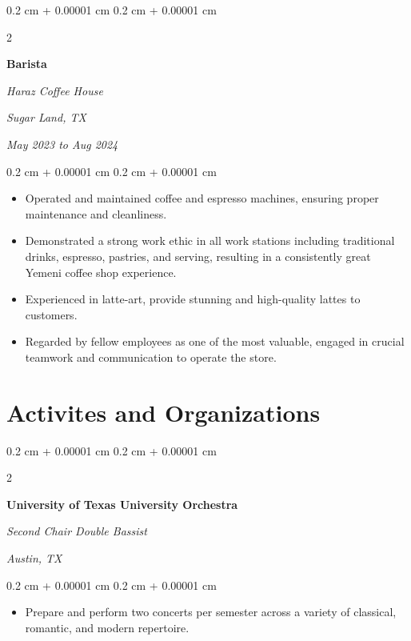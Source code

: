 \documentclass[10pt, letterpaper]{article}
\newenvironment{highlights}{
    \begin{itemize}[
        topsep=0.10 cm,
        parsep=0.10 cm,
        partopsep=0pt,
        itemsep=0pt,
        leftmargin=0.4 cm + 10pt
    ]
}{
    \end{itemize}
} %
\newenvironment{onecolentry}{
    \begin{adjustwidth}{
        0.2 cm + 0.00001 cm
    }{
        0.2 cm + 0.00001 cm
    }
}{
    \end{adjustwidth}
} %
\newenvironment{twocolentry}[2][]{
    \onecolentry
    \def\secondColumn{#2}
    \setcolumnwidth{\fill, 4.5 cm}
    \begin{paracol}{2}
}{
    \switchcolumn \raggedleft \secondColumn
    \end{paracol}
    \endonecolentry
} %
\begin{document}
        \vspace{0.2 cm}

        \begin{twocolentry}{
        \textit{Sugar Land, TX}    
            
        \textit{May 2023 to Aug 2024}}
            \textbf{Barista}
            
            \textit{Haraz Coffee House}
        \end{twocolentry}

        \vspace{0.10 cm}
        \begin{onecolentry}
            \begin{highlights}
                \item Operated and maintained coffee and espresso machines, ensuring proper maintenance and cleanliness.
                \item Demonstrated a strong work ethic in all work stations including traditional drinks, espresso, pastries, and serving, resulting in a consistently great Yemeni coffee shop experience.
                \item Experienced in latte-art, provide stunning and high-quality lattes to customers.
                \item Regarded by fellow employees as one of the most valuable, engaged in crucial teamwork and communication to operate the store.
            \end{highlights}
        \end{onecolentry}



    
    \section{Activites and Organizations}



        
        \begin{twocolentry}{
        \textit{Austin, TX}    
            
        }
            \textbf{University of Texas University Orchestra}
            
            \textit{Second Chair Double Bassist}
        \end{twocolentry}

        \vspace{0.10 cm}
        \begin{onecolentry}
            \begin{highlights}
                \item Prepare and perform two concerts per semester across a variety of classical, romantic, and modern repertoire.
            \end{highlights}
        \end{onecolentry}
\end{document}
